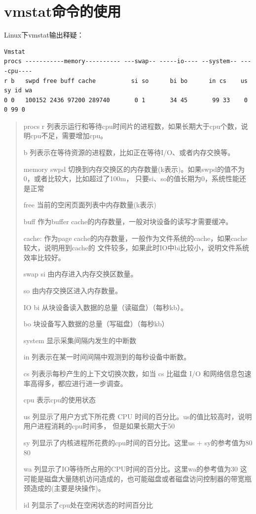 \section{vmstat命令的使用}
\label{sec:vmstatCmd}

Linux下vmstat输出释疑：

\begin{verbatim}
Vmstat
procs -----------memory---------- ---swap-- -----io---- --system-- ----cpu----
r b   swpd free buff cache          si so      bi bo      in cs    us sy id wa
0 0   100152 2436 97200 289740       0 1       34 45       99 33    0 0 99 0
\end{verbatim}

\begin{quote}
procs
r 列表示运行和等待cpu时间片的进程数，如果长期大于cpu个数，说明cpu不足，需要增加cpu。

b 列表示在等待资源的进程数，比如正在等待I/O、或者内存交换等。

memory
swpd 切换到内存交换区的内存数量(k表示)。如果swpd的值不为0，或者比较大，比如超过了100m，
     只要si、so的值长期为0，系统性能还是正常

free 当前的空闲页面列表中内存数量(k表示)

buff 作为buffer cache的内存数量，一般对块设备的读写才需要缓冲。

cache: 作为page cache的内存数量，一般作为文件系统的cache，如果cache较大，说明用到cache的
       文件较多，如果此时IO中bi比较小，说明文件系统效率比较好。

swap
si 由内存进入内存交换区数量。

so 由内存交换区进入内存数量。


IO
bi 从块设备读入数据的总量（读磁盘）（每秒kb）。

bo 块设备写入数据的总量（写磁盘）（每秒kb）


system 显示采集间隔内发生的中断数

in 列表示在某一时间间隔中观测到的每秒设备中断数。

cs 列表示每秒产生的上下文切换次数，如当 cs 比磁盘 I/O 和网络信息包速率高得多，都应进行进一步调查。



cpu 表示cpu的使用状态

us 列显示了用户方式下所花费 CPU 时间的百分比。us的值比较高时，说明用户进程消耗的cpu时间多，
   但是如果长期大于50%

sy 列显示了内核进程所花费的cpu时间的百分比。这里us + sy的参考值为80%
   80%

wa 列显示了IO等待所占用的CPU时间的百分比。这里wa的参考值为30%
   这可能是磁盘大量随机访问造成的，也可能磁盘或者磁盘访问控制器的带宽瓶颈造成的(主要是块操作)。

id 列显示了cpu处在空闲状态的时间百分比
\end{quote}


